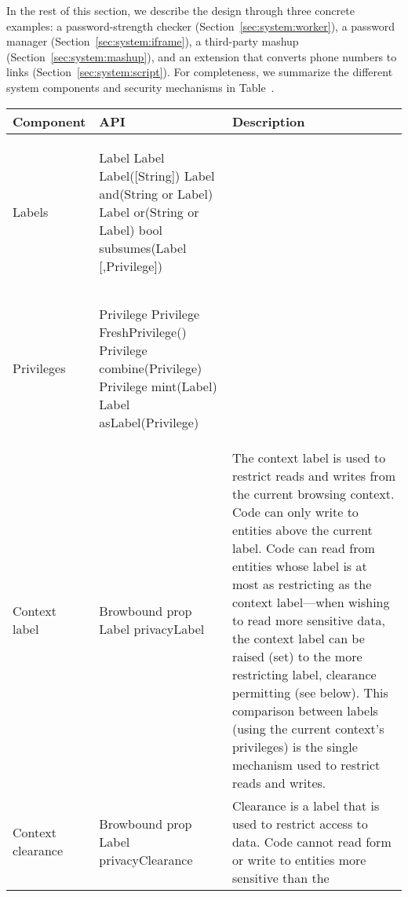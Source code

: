 In the rest of this section, we describe the \sys{} design through
three concrete examples: 
a password-strength checker (Section~\ref{sec:system:worker}),
a password manager (Section~\ref{sec:system:iframe}), 
a third-party mashup (Section~\ref{sec:system:mashup}), and
an extension that converts phone numbers to links
(Section~\ref{sec:system:script}).  %
%
For completeness, we summarize the different system components and
security mechanisms in Table~.

\begin{table*}[t]
\centering
\begin{tabular}{l | m{2.35in} | m{3.5in}}
\hline
\textbf{Component} & \textbf{API} & \textbf{Description} 
\\\hline %
Labels &  
\begin{webidl}
Label {
  Label Label([String])
  Label and(String or Label)
  Label or(String or Label)
  bool subsumes(Label [,Privilege])
}
\end{webidl}
&
\\\hline %
Privileges &  
\begin{webidl}
Privilege {
  Privilege FreshPrivilege()
  Privilege combine(Privilege)
  Privilege mint(Label)
  Label asLabel(Privilege)
}
\end{webidl}
&
\\\hline %
Context label &  
\begin{webidl}
Browbound {
  prop Label privacyLabel
}
\end{webidl}
&
The context label is used to restrict reads and writes from the
current browsing context.
%
Code can only write to entities above the current label.
%
Code can read from entities whose label is at most as restricting as
the context label---when wishing to read more sensitive data, the
context label can be raised (set) to the more restricting label,
clearance permitting (see below).
%
This comparison between labels (using the current context's
privileges) is the single mechanism used to restrict reads and writes.
\\\hline %
Context clearance  &  
\begin{webidl}
Browbound {
  prop Label privacyClearance
}
\end{webidl}
&
Clearance is a label that is used to restrict access to data.
%
Code cannot read form or write to entities more sensitive than the

\end{tabular}
\end{table*}

